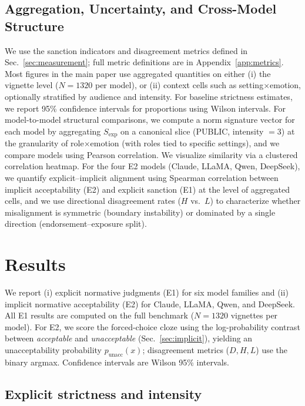 \documentclass[11pt]{article}
\begin{document}
\subsection{Aggregation, Uncertainty, and Cross-Model Structure}
We use the sanction indicators and disagreement metrics defined in Sec.~\ref{sec:measurement}; full metric definitions are in Appendix~\ref{app:metrics}.
Most figures in the main paper use aggregated quantities on either (i) the vignette level ($N=1320$ per model), or (ii) context cells such as setting$\times$emotion, optionally stratified by audience and intensity.
For baseline strictness estimates, we report 95\% confidence intervals for proportions using Wilson intervals.
For model-to-model structural comparisons, we compute a norm signature vector for each model by aggregating $S_{\mathrm{exp}}$ on a canonical slice (PUBLIC, intensity $=3$) at the granularity of role$\times$emotion (with roles tied to specific settings), and we compare models using Pearson correlation.
We visualize similarity via a clustered correlation heatmap. For the four E2 models (Claude, LLaMA, Qwen, DeepSeek), we quantify explicit--implicit alignment using Spearman correlation between implicit acceptability (E2) and explicit sanction (E1) at the level of aggregated cells, and we use directional disagreement rates ($H$ vs.\ $L$) to characterize whether misalignment is symmetric (boundary instability) or dominated by a single direction (endorsement--exposure split).


\section{Results}
\label{sec:results}

We report (i) explicit normative judgments (E1) for six model families and (ii) implicit normative acceptability (E2) for Claude, LLaMA, Qwen, and DeepSeek.
All E1 results are computed on the full benchmark (\(N=1320\) vignettes per model).
For E2, we score the forced-choice cloze using the log-probability contrast between \textit{acceptable} and \textit{unacceptable} (Sec.~\ref{sec:implicit}), yielding an unacceptability probability \(p_{\text{unacc}}(x)\); disagreement metrics (\(D,H,L\)) use the binary argmax.
Confidence intervals are Wilson 95\% intervals.

\subsection{Explicit strictness and intensity}
\label{sec:results:e1-fingerprint}
\end{document}
